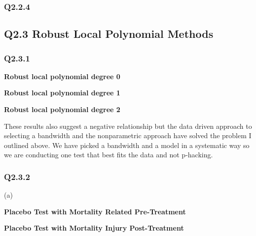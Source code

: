 \documentclass[11pt]{article}
\begin{document}
\subsubsection{Q2.2.4}



\subsection{Q2.3 Robust Local Polynomial Methods}

\subsubsection{Q2.3.1}

\begin{center}
	\centering
	\textbf{Robust local polynomial degree 0  }\par\medskip
	\scalebox{1}{
		
	}
\end{center}

\begin{center}
	\centering
	\textbf{Robust local polynomial degree 1  }\par\medskip
	\scalebox{1}{
		
	}
\end{center}


\begin{center}
	\centering
	\textbf{Robust local polynomial degree 2  }\par\medskip
	\scalebox{1}{
		
	}
\end{center}

These results also suggest a negative relationship but the data driven approach to selecting a bandwidth and the nonparametric approach have solved the problem I outlined above. We have picked a bandwidth and a model in a systematic way so we are conducting one test that best fits the data and not p-hacking. 

\subsubsection{Q2.3.2}
(a)

\begin{center}
	\centering
	\textbf{Placebo Test with Mortality Related Pre-Treatment }\par\medskip
	\scalebox{1}{
		
	}
\end{center}

\begin{center}
	\centering
	\textbf{Placebo Test with Mortality Injury Post-Treatment }\par\medskip
	\scalebox{1}{
		
	}
\end{center}
\end{document}
